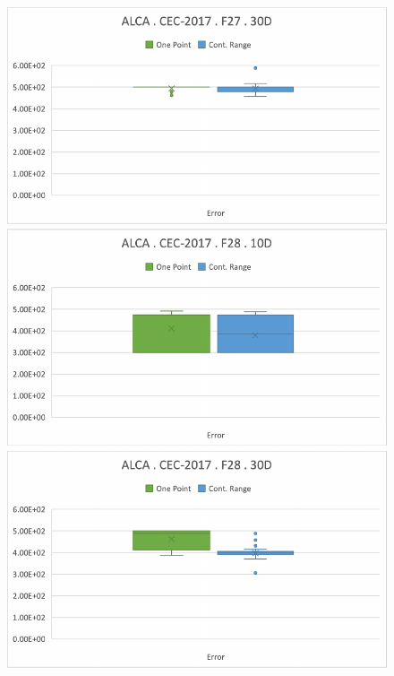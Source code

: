 \documentclass[graybox]{svmult}
\begin{document}
\begin{figure}[!ht]
\begin{minipage}[h]{0.49\linewidth}
        \end{minipage}
        \hfill
        \vspace{0.05 cm}
        \begin{minipage}[h]{0.49\linewidth}
            \includegraphics[width=1\linewidth]{img/fig_experiment_F27x30D.pdf} 
        \end{minipage}
        \vfill
        \vspace{0.05 cm}
        \begin{minipage}[h]{0.49\linewidth}
            \includegraphics[width=1\linewidth]{img/fig_experiment_F28x10D.pdf} 
        \end{minipage}
        \hfill
        \begin{minipage}[h]{0.49\linewidth}
            \includegraphics[width=1\linewidth]{img/fig_experiment_F28x30D.pdf} 

\end{minipage}
\end{figure}
\end{document}
